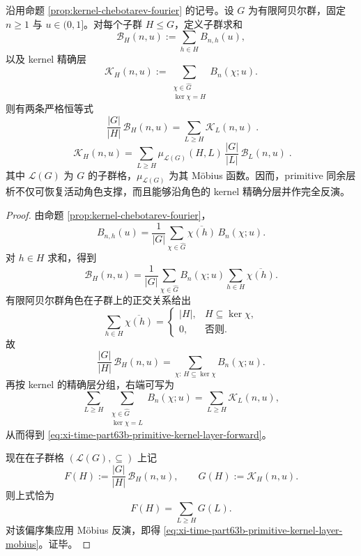 \begin{theorem}\label{thm:xi-time-part63b-primitive-kernel-layer-subgroup-mobius}
沿用命题 \ref{prop:kernel-chebotarev-fourier} 的记号。设 \(G\) 为有限阿贝尔群，固定 \(n\ge 1\) 与 \(u\in(0,1]\)。对每个子群 \(H\le G\)，定义子群求和
\[
\mathcal B_H(n,u):=\sum_{h\in H}B_{n,h}(u),
\]
以及 kernel 精确层
\[
\mathcal K_H(n,u)
:=
\sum_{\substack{\chi\in \widehat G\\ \ker\chi=H}} B_n(\chi;u).
\]
则有两条严格恒等式
\begin{equation}\label{eq:xi-time-part63b-primitive-kernel-layer-forward}
\boxed{\;
\frac{|G|}{|H|}\,\mathcal B_H(n,u)
=
\sum_{L\ge H}\mathcal K_L(n,u)\; }.
\end{equation}
\begin{equation}\label{eq:xi-time-part63b-primitive-kernel-layer-mobius}
\boxed{\;
\mathcal K_H(n,u)
=
\sum_{L\ge H}\mu_{\mathcal L(G)}(H,L)\,
\frac{|G|}{|L|}\,\mathcal B_L(n,u)\; }.
\end{equation}
其中 \(\mathcal L(G)\) 为 \(G\) 的子群格，\(\mu_{\mathcal L(G)}\) 为其 Möbius 函数。因而，primitive 同余层析不仅可恢复活动角色支撑，而且能够沿角色的 kernel 精确分层并作完全反演。
\end{theorem}
\begin{proof}
由命题 \ref{prop:kernel-chebotarev-fourier}，
\[
B_{n,h}(u)
=
\frac{1}{|G|}
\sum_{\chi\in\widehat G}\overline{\chi(h)}\,B_n(\chi;u).
\]
对 \(h\in H\) 求和，得到
\[
\mathcal B_H(n,u)
=
\frac{1}{|G|}
\sum_{\chi\in\widehat G}
B_n(\chi;u)\sum_{h\in H}\overline{\chi(h)}.
\]
有限阿贝尔群角色在子群上的正交关系给出
\[
\sum_{h\in H}\overline{\chi(h)}
=
\begin{cases}
|H|,& H\subseteq \ker\chi,\\[2pt]
0,& \text{否则}.
\end{cases}
\]
故
\[
\frac{|G|}{|H|}\,\mathcal B_H(n,u)
=
\sum_{\chi:\,H\subseteq \ker\chi}B_n(\chi;u).
\]
再按 kernel 的精确层分组，右端可写为
\[
\sum_{L\ge H}\ \sum_{\substack{\chi\in\widehat G\\ \ker\chi=L}}B_n(\chi;u)
=
\sum_{L\ge H}\mathcal K_L(n,u),
\]
从而得到
\eqref{eq:xi-time-part63b-primitive-kernel-layer-forward}。

现在在子群格 \((\mathcal L(G),\subseteq)\) 上记
\[
F(H):=\frac{|G|}{|H|}\,\mathcal B_H(n,u),
\qquad
G(H):=\mathcal K_H(n,u).
\]
则上式恰为
\[
F(H)=\sum_{L\ge H}G(L).
\]
对该偏序集应用 Möbius 反演，即得
\eqref{eq:xi-time-part63b-primitive-kernel-layer-mobius}。证毕。
\end{proof}

